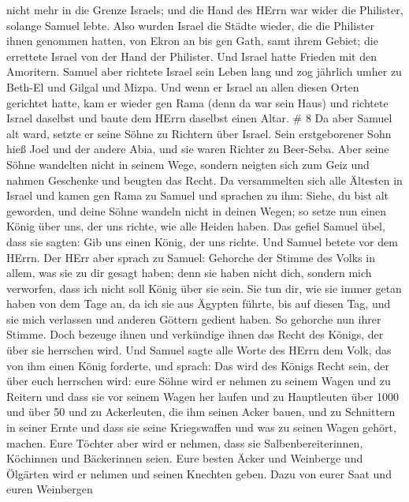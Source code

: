 nicht mehr in die Grenze Israels; und die Hand des HErrn war wider die
Philister, solange Samuel lebte.  Also wurden Israel die
Städte wieder, die die Philister ihnen genommen hatten, von Ekron an bis
gen Gath, samt ihrem Gebiet; die errettete Israel von der Hand der
Philister. Und Israel hatte Frieden mit den Amoritern. 
Samuel aber richtete Israel sein Leben lang  und zog
jährlich umher zu Beth-El und Gilgal und Mizpa. Und wenn er Israel an
allen diesen Orten gerichtet hatte,  kam er wieder gen Rama
(denn da war sein Haus) und richtete Israel daselbst und baute dem HErrn
daselbst einen Altar. \# 8  Da aber Samuel alt ward, setzte
er seine Söhne zu Richtern über Israel.  Sein erstgeborener
Sohn hieß Joel und der andere Abia, und sie waren Richter zu Beer-Seba.
 Aber seine Söhne wandelten nicht in seinem Wege, sondern
neigten sich zum Geiz und nahmen Geschenke und beugten das Recht.
 Da versammelten sich alle Ältesten in Israel und kamen gen
Rama zu Samuel  und sprachen zu ihm: Siehe, du bist alt
geworden, und deine Söhne wandeln nicht in deinen Wegen; so setze nun
einen König über uns, der uns richte, wie alle Heiden haben.
 Das gefiel Samuel übel, dass sie sagten: Gib uns einen
König, der uns richte. Und Samuel betete vor dem HErrn.  Der
HErr aber sprach zu Samuel: Gehorche der Stimme des Volks in allem, was
sie zu dir gesagt haben; denn sie haben nicht dich, sondern mich
verworfen, dass ich nicht soll König über sie sein.  Sie tun
dir, wie sie immer getan haben von dem Tage an, da ich sie aus Ägypten
führte, bis auf diesen Tag, und sie mich verlassen und anderen Göttern
gedient haben.  So gehorche nun ihrer Stimme. Doch bezeuge
ihnen und verkündige ihnen das Recht des Königs, der über sie herrschen
wird.  Und Samuel sagte alle Worte des HErrn dem Volk, das
von ihm einen König forderte,  und sprach: Das wird des
Königs Recht sein, der über euch herrschen wird: eure Söhne wird er
nehmen zu seinem Wagen und zu Reitern und dass sie vor seinem Wagen her
laufen  und zu Hauptleuten über 1000 und über 50 und zu
Ackerleuten, die ihm seinen Acker bauen, und zu Schnittern in seiner
Ernte und dass sie seine Kriegswaffen und was zu seinen Wagen gehört,
machen.  Eure Töchter aber wird er nehmen, dass sie
Salbenbereiterinnen, Köchinnen und Bäckerinnen seien.  Eure
besten Äcker und Weinberge und Ölgärten wird er nehmen und seinen
Knechten geben.  Dazu von eurer Saat und euren Weinbergen
